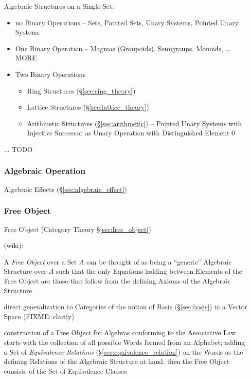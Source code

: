 Algebraic Structures on a Single Set:

\begin{itemize}
  \item no Binary Operations -- Sets, Pointed Sets, Unary Systems, Pointed
    Unary Systems
  \item One Binary Operation -- Magmas (Groupoids), Semigroups, Monoids, ...
    MORE
  \item Two Binary Operations
    \begin{itemize}
      \item Ring Structures (\S\ref{sec:ring_theory})
      \item Lattice Structures (\S\ref{sec:lattice_theory})
      \item Arithmetic Structures (\S\ref{sec:arithmetic}) -- Pointed Unary
        Systems with Injective Successor as Unary Operation with Distinguished
        Element $0$
    \end{itemize}
\end{itemize}

... TODO



\subsubsection{Algebraic Operation}\label{sec:algebraic_operation}

Algebraic Effects (\S\ref{sec:algebraic_effect})



\subsubsection{Free Object}\label{sec:universal_free_object}

\fist Free Object (Category Theory \S\ref{sec:free_object})

(wiki):

A \emph{Free Object} over a Set $A$ can be thought of as being a ``generic''
Algebraic Structure over $A$ such that the only Equations holding between
Elements of the Free Object are those that follow from the defining Axioms of
the Algebraic Structure

direct generalization to Categories of the notion of Basis (\S\ref{sec:basis})
in a Vector Space (FIXME: clarify)

construction of a Free Object for Algebras conforming to the Associative Law
starts with the collection of all possible Words formed from an Alphabet; adding
a Set of \emph{Equivalence Relations} (\S\ref{sec:equivalence_relation}) on the
Words as the defining Relations of the Algebraic Structure at hand, then the
Free Object consists of the Set of Equivalence Classes



